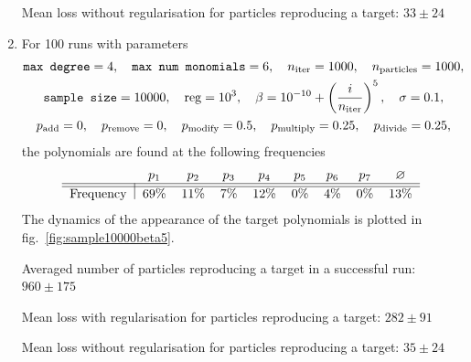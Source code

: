 \documentclass[11pt]{article}
\begin{document}
\begin{enumerate}
	  Mean loss without regularisation for particles reproducing a target: $33 \pm 24$
  		\item For 100 runs with parameters
		\begin{equation}
			\begin{gathered}
				\texttt{max degree} = 4, \quad \texttt{max num monomials} = 6, \quad n_{\rm iter} = 1000, \quad n_{\rm particles} = 1000, \\
				\texttt{sample size} = 10000, \quad {\rm reg} = 10^{3}, \quad \beta = 10^{-10} + \left(\frac{i}{n_{\rm iter}}\right)^{5}, \quad \sigma = 0.1, \\
				p_{\rm add} = 0, \quad p_{\rm remove} = 0, \quad p_{\rm modify} = 0.5, \quad p_{\rm multiply} = 0.25, \quad p_{\rm divide} = 0.25,
			\end{gathered}
		\end{equation}
		the polynomials are found at the following frequencies
	  \begin{equation}
	  	\begin{tabular}{l|cccccccc}
	  		& $p_{1}$ & $p_{2}$ & $p_{3}$ & $p_{4}$ & $p_{5}$ & $p_{6}$ & $p_{7}$ & $\varnothing$ \\\hline\hline
	  		Frequency & 69\% & 11\% & 7\% & 12\% & 0\% & 4\% & 0\% & 13\%
	  	\end{tabular}
	  \end{equation}
	  The dynamics of the appearance of the target polynomials is plotted in fig.~\ref{fig:sample10000beta5}.

	  Averaged number of particles reproducing a target in a successful run: $960 \pm 175$

	  Mean loss with regularisation for particles reproducing a target: $282 \pm 91$

	  Mean loss without regularisation for particles reproducing a target: $35 \pm 24$


\end{enumerate}
\end{document}

